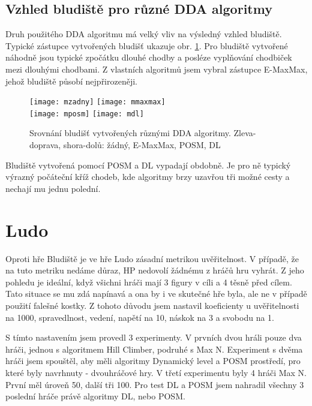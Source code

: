 \subsection{Vzhled bludiště pro různé DDA algoritmy}

Druh použitého DDA algoritmu má velký vliv na výsledný vzhled bludiště. Typické zástupce vytvořených bludišť ukazuje obr. \ref{fig-mazes}. Pro bludiště vytvořené náhodně jsou typické zpočátku dlouhé chodby a posléze vyplňování chodbiček mezi dlouhými chodbami. Z vlastních algoritmů jsem vybral zástupce E-MaxMax, jehož bludiště působí nejpřirozeněji.

\begin{figure}
  \centering
  \texttt{[image: mzadny]}
	\hspace{3pt}
	\texttt{[image: mmaxmax]} \\
	\vspace{6pt}
	\texttt{[image: mposm]}
	\hspace{3pt}
	\texttt{[image: mdl]}
	\caption{Srovnání bludišť vytvořených různými DDA algoritmy. Zleva-doprava, shora-dolů: žádný, E-MaxMax, POSM, DL}
	\label{fig-mazes}
\end{figure}

Bludiště vytvořená pomocí POSM a DL vypadají obdobně. Je pro ně typický výrazný počáteční kříž chodeb, kde algoritmy brzy uzavřou tři možné cesty a nechají mu jednu polední.

\section{Ludo}

Oproti hře Bludiště je ve hře Ludo zásadní metrikou uvěřitelnost. V případě, že na tuto metriku nedáme důraz, HP nedovolí žádnému z hráčů hru vyhrát. Z jeho pohledu je ideální, když všichni hráči mají 3 figury v cíli a 4 těsně před cílem. Tato situace se mu zdá napínavá a ona by i ve skutečné hře byla, ale ne v případě použití falešné kostky. Z tohoto důvodu jsem nastavil koeficienty u uvěřitelnosti na 1000, spravedlnost, vedení, napětí na 10, náskok na 3 a svobodu na 1.

S tímto nastavením jsem provedl 3 experimenty. V prvních dvou hráli pouze dva hráči, jednou s algoritmem Hill Climber, podruhé s Max N. Experiment s dvěma hráči jsem spouštěl, aby měli algoritmy Dynamický level a POSM prostředí, pro které byly navrhnuty - dvouhráčové hry. V třetí experimentu byly 4 hráči Max N. První měl úroveň 50, další tři 100. Pro test DL a POSM jsem nahradil všechny 3 poslední hráče právě algoritmy DL, nebo POSM.


